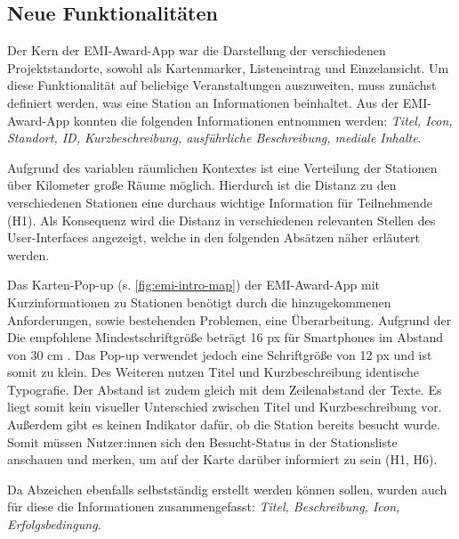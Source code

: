 \subsection{Neue Funktionalitäten}



Der Kern der EMI-Award-App war die Darstellung der verschiedenen
Projektstandorte, sowohl als Kartenmarker, Listeneintrag und Einzelansicht. Um
diese Funktionalität auf beliebige Veranstaltungen auszuweiten, muss zunächst
definiert werden, was eine Station an Informationen beinhaltet. Aus der
EMI-Award-App konnten die folgenden Informationen entnommen werden:
\textit{Titel, Icon, Standort, ID, Kurzbeschreibung, ausführliche Beschreibung,
    mediale Inhalte}.

Aufgrund des variablen räumlichen Kontextes ist eine Verteilung der Stationen
über Kilometer große Räume möglich. Hierdurch ist die Distanz zu den
verschiedenen Stationen eine durchaus wichtige Information für Teilnehmende
(H1). Als Konsequenz wird die Distanz in verschiedenen relevanten Stellen des
User-Interfaces angezeigt, welche in den folgenden Absätzen näher erläutert
werden.

Das Karten-Pop-up (s. \autoref{fig:emi-intro-map}) der EMI-Award-App mit
Kurzinformationen zu Stationen benötigt durch die hinzugekommenen Anforderungen,
sowie bestehenden Problemen, eine Überarbeitung. Aufgrund der Die empfohlene
Mindestschriftgröße beträgt 16 px für Smartphones im Abstand von 30 cm
\cite{DBSV2022}. Das Pop-up verwendet jedoch eine Schriftgröße von 12 px und ist
somit zu klein. Des Weiteren nutzen Titel und Kurzbeschreibung identische
Typografie. Der Abstand ist zudem gleich mit dem Zeilenabstand der Texte. Es
liegt somit kein visueller Unterschied zwischen Titel und Kurzbeschreibung vor.
Außerdem gibt es keinen Indikator dafür, ob die Station bereits besucht wurde.
Somit müssen Nutzer:innen sich den Besucht-Status in der Stationsliste anschauen
und merken, um auf der Karte darüber informiert zu sein (H1, H6).

Da Abzeichen ebenfalls selbstständig erstellt werden können
sollen, wurden auch für diese die Informationen zusammengefasst: \textit{Titel,
    Beschreibung, Icon, Erfolgsbedingung}.

